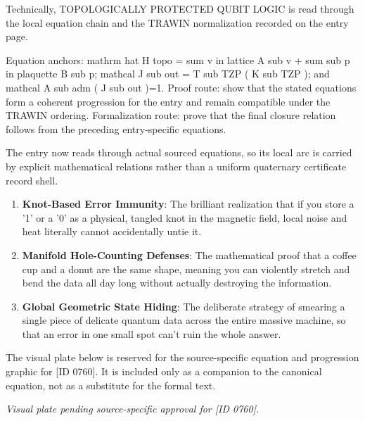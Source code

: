 Technically, TOPOLOGICALLY PROTECTED QUBIT LOGIC is read through the local equation chain and the TRAWIN normalization recorded on the entry page.

Equation anchors: mathrm hat H topo = sum v in lattice A sub v + sum sub p in plaquette B sub p; mathcal J sub out = T sub TZP ( K sub TZP ); and mathcal A sub adm ( J sub out )=1. Proof route: show that the stated equations form a coherent progression for the entry and remain compatible under the TRAWIN ordering. Formalization route: prove that the final closure relation follows from the preceding entry-specific equations.

The entry now reads through actual sourced equations, so its local arc is carried by explicit mathematical relations rather than a uniform quaternary certificate record shell.
\endgroup

\begin{enumerate}[leftmargin=1.6em,itemsep=6pt,topsep=4pt]
\item \textbf{Knot-Based Error Immunity}: The brilliant realization that if you store a '1' or a '0' as a physical, tangled knot in the magnetic field, local noise and heat literally cannot accidentally untie it.
\item \textbf{Manifold Hole-Counting Defenses}: The mathematical proof that a coffee cup and a donut are the same shape, meaning you can violently stretch and bend the data all day long without actually destroying the information.
\item \textbf{Global Geometric State Hiding}: The deliberate strategy of smearing a single piece of delicate quantum data across the entire massive machine, so that an error in one small spot can't ruin the whole answer.
\end{enumerate}

\begingroup\footnotesize\sloppy
The visual plate below is reserved for the source-specific equation and progression graphic for [ID 0760]. It is included only as a companion to the canonical equation, not as a substitute for the formal text.
\par\endgroup
\begingroup\footnotesize\itshape
Visual plate pending source-specific approval for [ID 0760].
\par\endgroup

